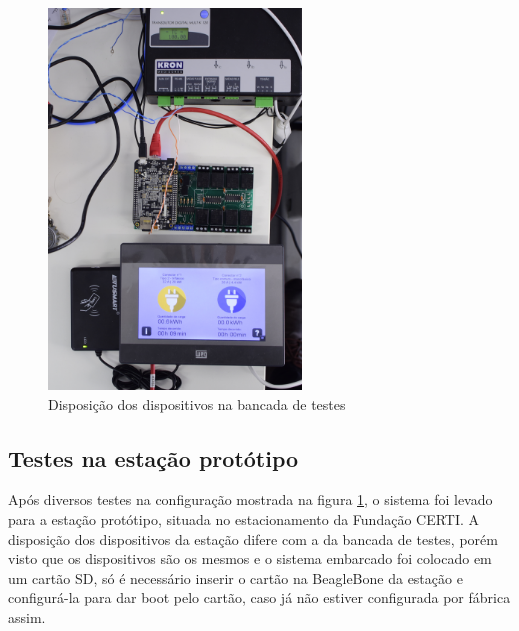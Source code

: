       \begin{figure}[H]
        \begin{center}
          \includegraphics[width=0.6\textwidth,natwidth=2130,natheight=1420,angle=-90]{assets/images/prototype-setup.jpg}
          \caption{Disposição dos dispositivos na bancada de testes}
          \label{fig:prototype-setup}
        \end{center}
      \end{figure}

    \subsection{Testes na estação protótipo}

      Após diversos testes na configuração mostrada na figura \ref{fig:prototype-setup}, o sistema foi levado para a estação protótipo, situada no estacionamento da Fundação CERTI. A disposição dos dispositivos da estação difere com a da bancada de testes, porém visto que os dispositivos são os mesmos e o sistema embarcado foi colocado em um cartão SD, só é necessário inserir o cartão na BeagleBone da estação e configurá-la para dar boot pelo cartão, caso já não estiver configurada por fábrica assim.

